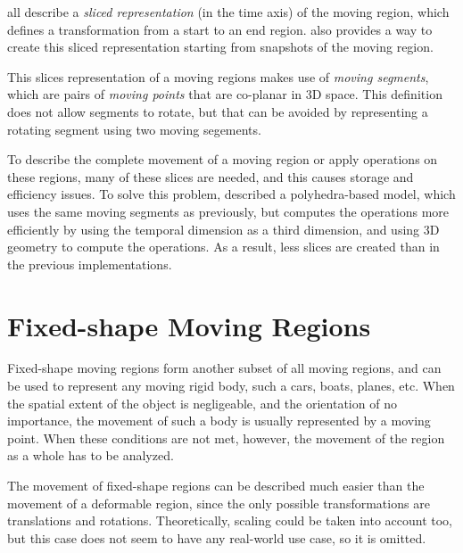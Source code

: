 all describe a \textit{sliced representation} (in the time axis) of the moving region, which defines a transformation from a start to an end region.  also provides a way to create this sliced representation starting from snapshots of the moving region.


This slices representation of a moving regions makes use of \textit{moving segments}, which are pairs of \textit{moving points} that are co-planar in 3D space. This definition does not allow segments to rotate, but that can be avoided by representing a rotating segment using two moving segements.


To describe the complete movement of a moving region or apply operations on these regions, many of these slices are needed, and this causes storage and efficiency issues. To solve this problem,  described a polyhedra-based model, which uses the same moving segments as previously, but computes the operations more efficiently by using the temporal dimension as a third dimension, and using 3D geometry to compute the operations. As a result, less slices are created than in the previous implementations.

\section{Fixed-shape Moving Regions}

Fixed-shape moving regions form another subset of all moving regions, and can be used to represent any moving rigid body, such a cars, boats, planes, etc. When the spatial extent of the object is negligeable, and the orientation of no importance, the movement of such a body is usually represented by a moving point. When these conditions are not met, however, the movement of the region as a whole has to be analyzed.

The movement of fixed-shape regions can be described much easier than the movement of a deformable region, since the only possible transformations are translations and rotations. Theoretically, scaling could be taken into account too, but this case does not seem to have any real-world use case, so it is omitted.

